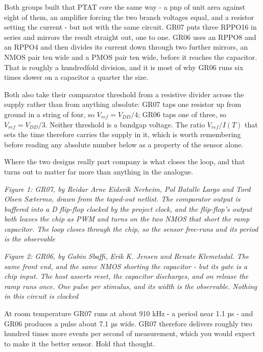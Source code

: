 Both groups built that PTAT core the same way - a pnp of unit area
against eight of them, an amplifier forcing the two branch voltages
equal, and a resistor setting the current - but not with the same
circuit. GR07 puts three RPPO16 in series and mirrors the result
straight out, one to one. GR06 uses an RPPO8 and an RPPO4 and then
divides its current down through two further mirrors, an NMOS pair ten
wide and a PMOS pair ten wide, before it reaches the capacitor. That is
roughly a hundredfold division, and it is most of why GR06 runs six
times slower on a capacitor a quarter the size.

Both also take their comparator threshold from a resistive divider
across the supply rather than from anything absolute: GR07 taps one
resistor up from ground in a string of four, so \(V_{ref} = V_{DD}/4\);
GR06 taps one of three, so \(V_{ref} = V_{DD}/3\). Neither threshold is
a bandgap voltage. The ratio \(V_{ref}/I(T)\) that sets the time
therefore carries the supply in it, which is worth remembering before
reading any absolute number below as a property of the sensor alone.

Where the two designs really part company is what closes the loop, and
that turns out to matter far more than anything in the analogue.


{
\centering
{}
}

\emph{Figure 1: GR07, by Reidar Arne Eidsvik Nerheim, Pol Batalle Largo
and Tord Olsen Sætermo, drawn from the taped-out netlist. The comparator
output is buffered into a D flip-flop clocked by the project clock, and
the flip-flop's output both leaves the chip as PWM and turns on the two
NMOS that short the ramp capacitor. The loop closes through the chip, so
the sensor free-runs and its period is the observable}


{
\centering
{}
}

\emph{Figure 2: GR06, by Gabin Sbaffi, Erik K. Jensen and Renate
Klemetsdal. The same front end, and the same NMOS shorting the capacitor
- but its gate is a chip input. The host asserts reset, the capacitor
discharges, and on release the ramp runs once. One pulse per stimulus,
and its width is the observable. Nothing in this circuit is clocked}

At room temperature GR07 runs at about 910 kHz - a period near 1.1 µs -
and GR06 produces a pulse about 7.1 µs wide. GR07 therefore delivers
roughly two hundred times more events per second of measurement, which
you would expect to make it the better sensor. Hold that thought.

